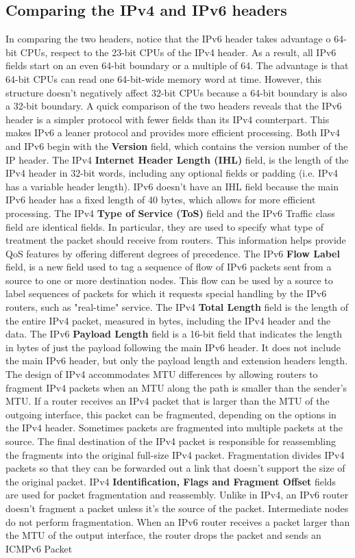 \documentclass[11pt]{article}
\begin{document}
\subsection{Comparing the IPv4 and IPv6 headers}
In comparing the two headers, notice that the IPv6 header takes advantage o 64-bit CPUs, respect to the 23-bit CPUs of the IPv4 header. As a result, all IPv6 fields start on an even 64-bit boundary or a multiple of 64. The advantage is that 64-bit CPUs can read one 64-bit-wide memory word at time. However, this structure doesn't negatively affect 32-bit CPUs because a 64-bit boundary is also a 32-bit boundary. A quick comparison of the two headers reveals that the IPv6 header is a simpler protocol with fewer fields than its IPv4 counterpart. This makes IPv6 a leaner protocol and provides more efficient processing. Both IPv4 and IPv6 begin with the \textbf{Version} field, which contains the version number of the IP header. The IPv4 \textbf{Internet Header Length (IHL)} field, is the length of the IPv4 header in 32-bit words, including any optional fields or padding (i.e. IPv4 has a variable header length). IPv6 doesn't have an IHL field because the main IPv6 header has a fixed length of 40 bytes, which allows for more efficient processing. The IPv4 \textbf{Type of Service (ToS)} field and the IPv6 Traffic class field are identical fields. In particular, they are used to specify what type of treatment the packet should receive from routers. This information helps provide QoS features by offering different degrees of precedence. The IPv6 \textbf{Flow Label} field, is a new field used to tag a sequence of flow of IPv6 packets sent from a source to one or more destination nodes. This flow can be used by a source to label sequences of packets for which it requests special handling by the IPv6 routers, such as "real-time" service. The IPv4 \textbf{Total Length} field is the length of the entire IPv4 packet, measured in bytes, including the IPv4 header and the data. The IPv6 \textbf{Payload Length} field is a 16-bit field that indicates the length in bytes of just the payload following the main IPv6 header. It does not include the main IPv6 header, but only the payload length and extension headers length. The design of IPv4 accommodates MTU differences by allowing routers to fragment IPv4 packets when an MTU along the path is smaller than the sender's MTU. If a router receives an IPv4 packet that is larger than the MTU of the outgoing interface, this packet can be fragmented, depending on the options in the IPv4 header. Sometimes packets are fragmented into multiple packets at the source. The final destination of the IPv4 packet is responsible for reassembling the fragments into the original full-size IPv4 packet. Fragmentation divides IPv4 packets so that they can be forwarded out a link that doesn't support the size of the original packet. IPv4 \textbf{Identification, Flags and Fragment Offset} fields are used for packet fragmentation and reassembly. Unlike in IPv4, an IPv6 router doesn't fragment a packet unless it's the source of the packet. Intermediate nodes do not perform fragmentation. When an IPv6 router receives a packet larger than the MTU of the output interface, the router drops the packet and sends an ICMPv6 Packet 
\end{document}
